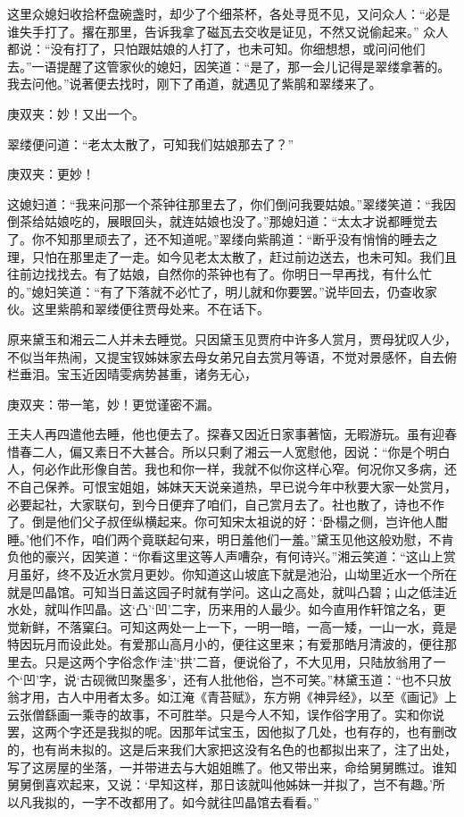 \begin{parag}
    这里众媳妇收拾杯盘碗盏时，却少了个细茶杯，各处寻觅不见，又问众人：“必是谁失手打了。撂在那里，告诉我拿了磁瓦去交收是证见，不然又说偷起来。” 众人都说：“没有打了，只怕跟姑娘的人打了，也未可知。你细想想，或问问他们去。”一语提醒了这管家伙的媳妇，因笑道：“是了，那一会儿记得是翠缕拿著的。我去问他。”说著便去找时，刚下了甬道，就遇见了紫鹃和翠缕来了。\begin{note}庚双夹：妙！又出一个。\end{note}翠缕便问道：“老太太散了，可知我们姑娘那去了？”\begin{note}庚双夹：更妙！\end{note}这媳妇道：“我来问那一个茶钟往那里去了，你们倒问我要姑娘。”翠缕笑道：“我因倒茶给姑娘吃的，展眼回头，就连姑娘也没了。”那媳妇道：“太太才说都睡觉去了。你不知那里顽去了，还不知道呢。”翠缕向紫鹃道：“断乎没有悄悄的睡去之理，只怕在那里走了一走。如今见老太太散了，赶过前边送去，也未可知。我们且往前边找找去。有了姑娘，自然你的茶钟也有了。你明日一早再找，有什么忙的。”媳妇笑道：“有了下落就不必忙了，明儿就和你要罢。”说毕回去，仍查收家伙。这里紫鹃和翠缕便往贾母处来。不在话下。
\end{parag}


\begin{parag}
    原来黛玉和湘云二人并未去睡觉。只因黛玉见贾府中许多人赏月，贾母犹叹人少，不似当年热闹，又提宝钗姊妹家去母女弟兄自去赏月等语，不觉对景感怀，自去俯栏垂泪。宝玉近因晴雯病势甚重，诸务无心，\begin{note}庚双夹：带一笔，妙！更觉谨密不漏。\end{note}王夫人再四遣他去睡，他也便去了。探春又因近日家事著恼，无暇游玩。虽有迎春惜春二人，偏又素日不大甚合。所以只剩了湘云一人宽慰他，因说：“你是个明白人，何必作此形像自苦。我也和你一样，我就不似你这样心窄。何况你又多病，还不自己保养。可恨宝姐姐，姊妹天天说亲道热，早已说今年中秋要大家一处赏月，必要起社，大家联句，到今日便弃了咱们，自己赏月去了。社也散了，诗也不作了。倒是他们父子叔侄纵横起来。你可知宋太祖说的好：‘卧榻之侧，岂许他人酣睡。’他们不作，咱们两个竟联起句来，明日羞他们一羞。”黛玉见他这般劝慰，不肯负他的豪兴，因笑道：“你看这里这等人声嘈杂，有何诗兴。”湘云笑道：“这山上赏月虽好，终不及近水赏月更妙。你知道这山坡底下就是池沿，山坳里近水一个所在就是凹晶馆。可知当日盖这园子时就有学问。这山之高处，就叫凸碧；山之低洼近水处，就叫作凹晶。这‘凸’‘凹’二字，历来用的人最少。如今直用作轩馆之名，更觉新鲜，不落窠臼。可知这两处一上一下，一明一暗，一高一矮，一山一水，竟是特因玩月而设此处。有爱那山高月小的，便往这里来；有爱那皓月清波的，便往那里去。只是这两个字俗念作‘洼’‘拱’二音，便说俗了，不大见用，只陆放翁用了一个‘凹’字，说‘古砚微凹聚墨多’，还有人批他俗，岂不可笑。”林黛玉道：“也不只放翁才用，古人中用者太多。如江淹《青苔赋》，东方朔《神异经》，以至《画记》上云张僧繇画一乘寺的故事，不可胜举。只是今人不知，误作俗字用了。实和你说罢，这两个字还是我拟的呢。因那年试宝玉，因他拟了几处，也有存的，也有删改的，也有尚未拟的。这是后来我们大家把这没有名色的也都拟出来了，注了出处，写了这房屋的坐落，一并带进去与大姐姐瞧了。他又带出来，命给舅舅瞧过。谁知舅舅倒喜欢起来，又说：‘早知这样，那日该就叫他姊妹一并拟了，岂不有趣。’所以凡我拟的，一字不改都用了。如今就往凹晶馆去看看。”
\end{parag}


